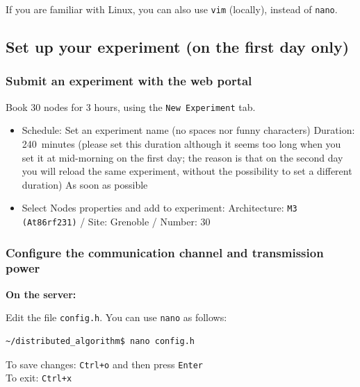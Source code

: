 \documentclass[oneside]{article}
\begin{document}
If you are familiar with Linux, you can also use \verb=vim= (locally), instead of \verb=nano=.

\subsection{Set up your experiment (on the first day only)}


\subsubsection{Submit an experiment with the web portal}
Book 30 nodes for 3 hours, using the \verb=New Experiment= tab.
\begin{itemize}
\item Schedule:
\subitem Set an experiment name (no spaces nor funny characters)
\subitem Duration: 240~minutes (please set this duration although it seems too long when you set it at mid-morning on the first day; the reason is that on the second day you will reload the same experiment, without the possibility to set a different duration)
\subitem As soon as possible
\item Select Nodes properties and add to experiment: 
\subitem Architecture: \texttt{M3 (At86rf231)} / Site: Grenoble / Number: $30$
\end{itemize}

\subsubsection{Configure the communication channel and transmission power}
\label{subsec:config.h}

\textbf{On the server:}

Edit the file  \verb=config.h=. 
You can use \verb=nano= as follows:
    \begin{verbatim}~/distributed_algorithm$ nano config.h \end{verbatim}
To save changes: \verb=Ctrl+o= and then press \verb=Enter= \\
To exit: \verb=Ctrl+x= \\
\end{document}
